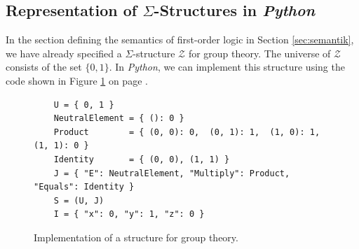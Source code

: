 \subsection{Representation of $\Sigma$-Structures in \textsl{Python}}
In the section defining  the semantics of first-order logic in Section \ref{sec:semantik}, we
have already specified  a $\Sigma$-structure $\mathcal{Z}$ for group theory.  The universe of $\mathcal{Z}$
consists of the set $\{ 0, 1 \}$. In \textsl{Python}, we can 
implement this structure using the code shown in Figure \ref{fig:Group.ipynb} on page
\pageref{fig:Group.ipynb}. 

\begin{figure}[!ht]
\centering
\begin{verbatim}
    U = { 0, 1 }  
    NeutralElement = { (): 0 }
    Product        = { (0, 0): 0,  (0, 1): 1,  (1, 0): 1,  (1, 1): 0 }
    Identity       = { (0, 0), (1, 1) }
    J = { "E": NeutralElement, "Multiply": Product, "Equals": Identity }
    S = (U, J)
    I = { "x": 0, "y": 1, "z": 0 }
\end{verbatim}
\vspace*{-0.3cm}
\caption{Implementation of a structure for group theory.}
\label{fig:Group.ipynb}
\end{figure}
